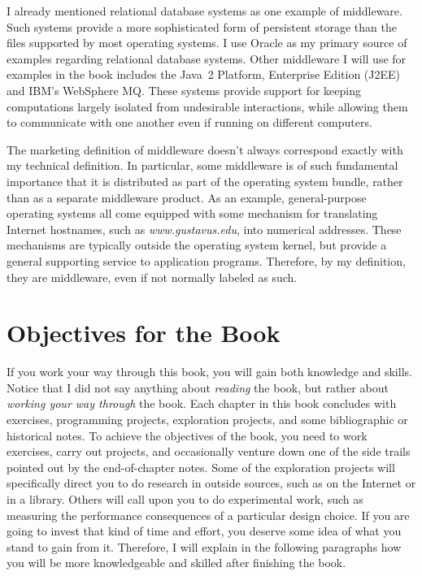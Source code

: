 I already mentioned relational database systems as one example of
middleware.  Such systems provide a more sophisticated form of persistent storage
than the files supported by most operating systems.  I use Oracle as
my primary source of examples regarding relational database systems.
Other middleware I will use for examples in the book includes the
Java~2 Platform, Enterprise Edition (J2EE) and IBM's WebSphere MQ.  These
systems provide support for keeping computations largely isolated from
undesirable interactions, while allowing them to communicate with one
another even if running on different computers.

The marketing definition of middleware doesn't always correspond
exactly with my technical definition.  In particular, some middleware
is of such fundamental importance that it is distributed as part of
the operating system bundle, rather than as a separate middleware
product.  As an example, general-purpose operating systems all come
equipped with some mechanism for translating Internet hostnames, such as
\textit{www.gustavus.edu}, into numerical addresses.  These mechanisms are
typically outside the operating system kernel, but provide a general
supporting service to application programs.  Therefore, by my
definition, they are middleware, even if not normally labeled as such.

\section{Objectives for the Book}\label{book-objectives-section}

If you work your way through this book, you will gain both knowledge
and skills.  Notice that I did not say anything about {\em reading}
the book, but rather about {\em working your way through} the book.
Each chapter in this book concludes with exercises, programming
projects, exploration projects, and some bibliographic or historical
notes.  To achieve the objectives of the book, you need to work
exercises, carry out projects, and occasionally venture down one of
the side trails pointed out by the end-of-chapter notes.  Some of the
exploration projects will specifically direct you to do research in
outside sources, such as on the Internet or in a library.  Others will
call upon you to do experimental work, such as measuring the
performance consequences of a particular design choice. If you are
going to invest that kind of time and effort, you deserve some idea of
what you stand to gain from it.  Therefore, I will explain in the
following paragraphs how you
will be more knowledgeable and skilled after finishing the book.

